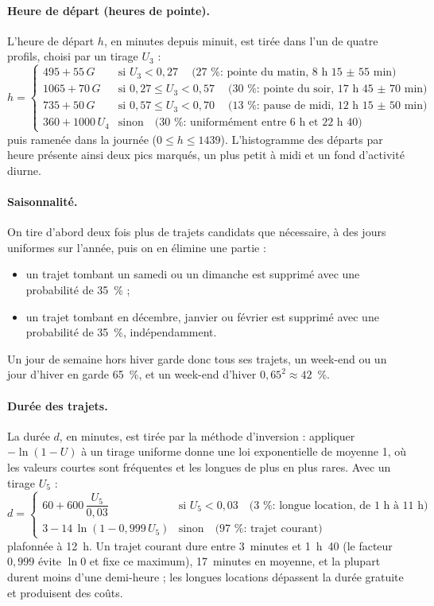 \paragraph{Heure de départ (heures de pointe).} L'heure de départ $h$, en minutes depuis minuit, est tirée dans l'un de quatre profils, choisi par un tirage $U_3$ :
\[
	h = \begin{cases}
		495 + 55\,G  & \text{si } U_3 < 0{,}27 \quad \text{(27~\% : pointe du matin, 8~h~15 $\pm$ 55~min)} \\
		1065 + 70\,G & \text{si } 0{,}27 \le U_3 < 0{,}57 \quad \text{(30~\% : pointe du soir, 17~h~45 $\pm$ 70~min)} \\
		735 + 50\,G  & \text{si } 0{,}57 \le U_3 < 0{,}70 \quad \text{(13~\% : pause de midi, 12~h~15 $\pm$ 50~min)} \\
		360 + 1000\,U_4 & \text{sinon} \quad \text{(30~\% : uniformément entre 6~h et 22~h~40)}
	\end{cases}
\]
puis ramenée dans la journée ($0 \le h \le 1439$). L'histogramme des départs par heure présente ainsi deux pics marqués, un plus petit à midi et un fond d'activité diurne.

\paragraph{Saisonnalité.} On tire d'abord deux fois plus de trajets candidats que nécessaire, à des jours uniformes sur l'année, puis on en élimine une partie :
\begin{itemize}
	\item un trajet tombant un samedi ou un dimanche est supprimé avec une probabilité de 35~\% ;
	\item un trajet tombant en décembre, janvier ou février est supprimé avec une probabilité de 35~\%, indépendamment.
\end{itemize}
Un jour de semaine hors hiver garde donc tous ses trajets, un week-end ou un jour d'hiver en garde 65~\%, et un week-end d'hiver $0{,}65^2 \approx 42$~\%.

\paragraph{Durée des trajets.} La durée $d$, en minutes, est tirée par la méthode d'inversion : appliquer $-\ln(1-U)$ à un tirage uniforme donne une loi exponentielle de moyenne 1, où les valeurs courtes sont fréquentes et les longues de plus en plus rares. Avec un tirage $U_5$ :
\[
	d = \begin{cases}
		60 + 600\,\dfrac{U_5}{0{,}03} & \text{si } U_5 < 0{,}03 \quad \text{(3~\% : longue location, de 1~h à 11~h)} \\[1ex]
		3 - 14\,\ln(1 - 0{,}999\,U_5) & \text{sinon} \quad \text{(97~\% : trajet courant)}
	\end{cases}
\]
plafonnée à 12~h. Un trajet courant dure entre 3~minutes et 1~h~40 (le facteur $0{,}999$ évite $\ln 0$ et fixe ce maximum), 17~minutes en moyenne, et la plupart durent moins d'une demi-heure ; les longues locations dépassent la durée gratuite et produisent des coûts.

